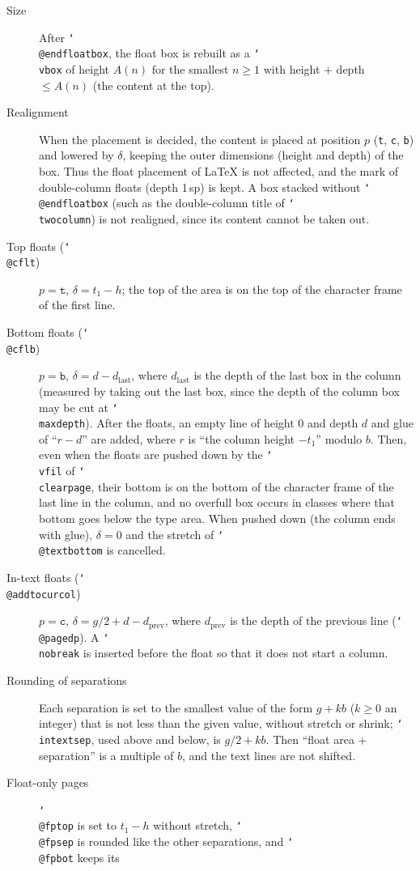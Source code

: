 \documentclass[paper=a4,dvipdfmx]{jlreq}
\newcommand\opt[1]{\texttt{#1}}
\newcommand\cs[1]{\texttt{\char`\\#1}}
\begin{document}
\begin{description}
\item[Size] After \cs{@endfloatbox}, the float box is rebuilt as a \cs{vbox} of
  height $A(n)$ for the smallest $n\ge1$ with height $+$ depth $\le A(n)$ (the
  content at the top).
\item[Realignment] When the placement is decided, the content is placed at
  position $p$ (\opt{t}, \opt{c}, \opt{b}) and lowered by $\delta$, keeping the outer
  dimensions (height and depth) of the box. Thus the float placement of \LaTeX{}
  is not affected, and the mark of double-column floats (depth 1\,sp) is kept.
  A box stacked without \cs{@endfloatbox} (such as the double-column title of
  \cs{twocolumn}) is not realigned, since its content cannot be taken out.
\item[Top floats (\cs{@cflt})] $p=\opt{t}$, $\delta=t_1-h$; the top of the
  area is on the top of the character frame of the first line.
\item[Bottom floats (\cs{@cflb})] $p=\opt{b}$, $\delta=d-d_{\mathrm{last}}$, where
  $d_{\mathrm{last}}$ is the depth of the last box in the column (measured by
  taking out the last box, since the depth of the column box may be cut at
  \cs{maxdepth}). After the floats, an empty line of
  height 0 and depth $d$ and glue of ``$r-d$'' are added, where $r$ is ``the
  column height $-t_1$'' modulo $b$. Then, even when the floats are
  pushed down by the \cs{vfil} of \cs{clearpage}, their bottom is on the bottom of
  the character frame of the last line in the column, and no overfull box occurs
  in classes where that bottom goes below the type area. When pushed down (the
  column ends with glue), $\delta=0$ and the stretch of \cs{@textbottom} is
  cancelled.
\item[In-text floats (\cs{@addtocurcol})] $p=\opt{c}$,
  $\delta=g/2+d-d_{\mathrm{prev}}$, where $d_{\mathrm{prev}}$ is the depth of the
  previous line (\cs{@pagedp}). A \cs{nobreak} is inserted before the float so that
  it does not start a column.
\item[Rounding of separations] Each separation is set to the smallest value of
  the form $g+kb$ ($k\ge0$ an integer) that is not less than the given value,
  without stretch or shrink; \cs{intextsep}, used above and below, is
  $g/2+kb$. Then ``float area $+$ separation'' is a multiple of $b$, and the text
  lines are not shifted.
\item[Float-only pages] \cs{@fptop} is set to $t_1-h$ without stretch,
  \cs{@fpsep} is rounded like the other separations, and \cs{@fpbot} keeps its

\end{description}
\end{document}
